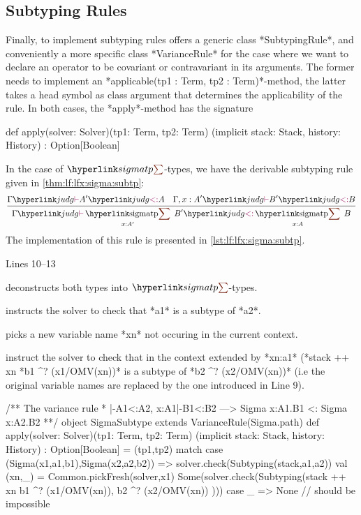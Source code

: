 \subsection{Subtyping Rules}\label{sec:lf:lfx:rules:subtyping}

Finally, to implement subtyping rules \mmt offers a generic class *SubtypingRule*, and conveniently a more specific class *VarianceRule* for the case where we want to declare an operator to be covariant or contravariant in its arguments. The former needs to implement an *applicable(tp1 : Term, tp2 : Term)*-method, the latter takes a head symbol as class argument that determines the applicability of the rule. In both cases, the *apply*-method has the signature
\begin{scalacode}
def apply(solver: Solver)(tp1: Term, tp2: Term)
	(implicit stack: Stack, history: History) : Option[Boolean]
\end{scalacode}

\begin{example}
In the case of $\sigmasym$-types, we have the derivable subtyping rule given in \autoref{thm:lf:lfx:sigma:subtp}:
\[
	\irule{\gjudg{\subtp {A'}A}\quad\judg{\Gamma,x:A'}{\subtp {B'}B}}
	{\gjudg{\subtp{\sigmatp{x:A'}{B'}}{\sigmatp{x:A}B}}}
\]
The implementation of this rule is presented in \autoref{lst:lf:lfx:sigma:subtp}.
	
	\begin{labeling}{Lines 10--13}
	\item[Line 7] deconstructs both types into $\sigmasym$-types.
	\item[Line 8] instructs the solver to check that *a1* is a subtype of *a2*.
	\item[Line 9] picks a new variable name *xn* not occuring in the current context.
	\item[Lines 10--13] instruct the solver to check that in the context extended by *xn:a1* (*stack ++ xn%
		*b1 ^? (x1/OMV(xn))* is a subtype of *b2 ^? (x2/OMV(xn))* (i.e the original variable names are replaced
		by the one introduced in Line 9).
\end{labeling}
	
	\begin{nscalacode}[caption={Subtyping Rule\protect\footnotemark},label=lst:lf:lfx:sigma:subtp,emph={Sigma,Tuple,Proj1,Proj2,Product}]
/** The variance rule 
   * |-A1<:A2, x:A1|-B1<:B2 ---> Sigma x:A1.B1 <: Sigma x:A2.B2 **/
object SigmaSubtype extends VarianceRule(Sigma.path) {
  def apply(solver: Solver)(tp1: Term, tp2: Term)
  	(implicit stack: Stack, history: History) : Option[Boolean] 
   = (tp1,tp2) match {
    case (Sigma(x1,a1,b1),Sigma(x2,a2,b2)) =>
      solver.check(Subtyping(stack,a1,a2))
      val (xn,_) = Common.pickFresh(solver,x1)
      Some(solver.check(Subtyping(stack ++ xn%
      	b1 ^? (x1/OMV(xn)),
      	b2 ^? (x2/OMV(xn))
      )))
    case _ => None // should be impossible
  }
}
\end{nscalacode}
\end{example}

